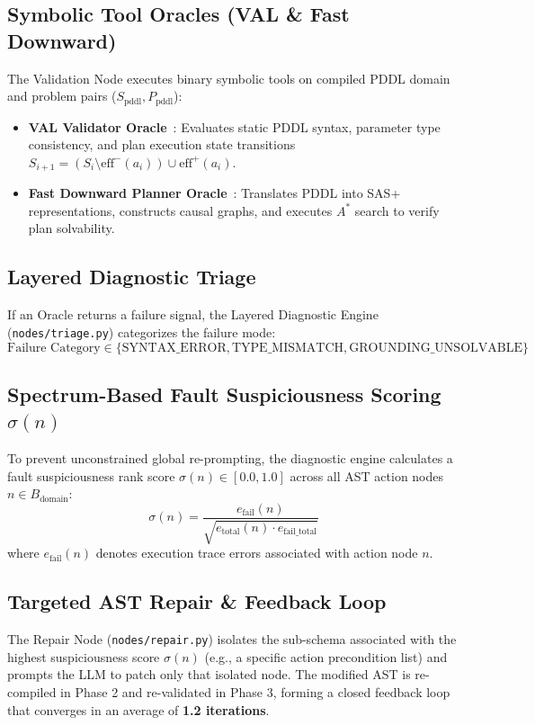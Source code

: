 \subsection{Symbolic Tool Oracles (VAL \& Fast Downward)}
The Validation Node executes binary symbolic tools on compiled PDDL domain and problem pairs ($S_{\text{pddl}}, P_{\text{pddl}}$):
\begin{itemize}
    \item \textbf{VAL Validator Oracle}~\cite{howey2004}: Evaluates static PDDL syntax, parameter type consistency, and plan execution state transitions $S_{i+1} = (S_i \setminus \text{eff}^-(a_i)) \cup \text{eff}^+(a_i)$.
    \item \textbf{Fast Downward Planner Oracle}~\cite{helmert2006}: Translates PDDL into SAS+ representations, constructs causal graphs, and executes $A^*$ search to verify plan solvability.
\end{itemize}

\subsection{Layered Diagnostic Triage}
If an Oracle returns a failure signal, the Layered Diagnostic Engine (\texttt{nodes/triage.py}) categorizes the failure mode:
\begin{equation}
\text{Failure Category} \in \{\text{SYNTAX\_ERROR}, \text{TYPE\_MISMATCH}, \text{GROUNDING\_UNSOLVABLE}\}
\end{equation}

\subsection{Spectrum-Based Fault Suspiciousness Scoring \texorpdfstring{$\sigma(n)$}{sigma(n)}}
To prevent unconstrained global re-prompting, the diagnostic engine calculates a fault suspiciousness rank score $\sigma(n) \in [0.0, 1.0]$ across all AST action nodes $n \in B_{\text{domain}}$:
\begin{equation}
\sigma(n) = \frac{e_{\text{fail}}(n)}{\sqrt{e_{\text{total}}(n) \cdot e_{\text{fail\_total}}}}
\end{equation}
where $e_{\text{fail}}(n)$ denotes execution trace errors associated with action node $n$.

\subsection{Targeted AST Repair \& Feedback Loop}
The Repair Node (\texttt{nodes/repair.py}) isolates the sub-schema associated with the highest suspiciousness score $\sigma(n)$ (e.g., a specific action precondition list) and prompts the LLM to patch only that isolated node. The modified AST is re-compiled in Phase 2 and re-validated in Phase 3, forming a closed feedback loop that converges in an average of \textbf{1.2 iterations}.

